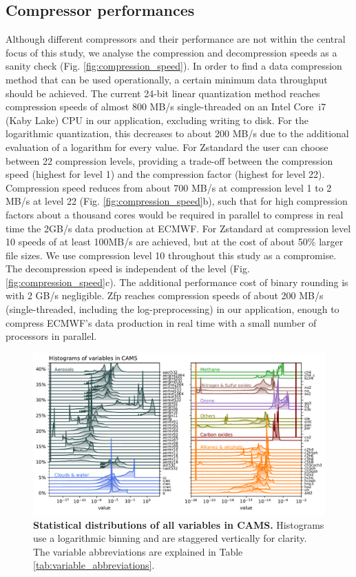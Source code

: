 \subsection{Compressor performances}

Although different compressors and their performance are not within the central focus of this study, we analyse
the compression and decompression speeds as a sanity check (Fig. \ref{fig:compression_speed}). In order to
find a data compression method that can be used operationally, a certain minimum data throughput should be achieved.
The current 24-bit linear quantization method reaches compression speeds of almost 800 MB/s single-threaded on an
Intel Core\texttrademark~i7 (Kaby Lake) CPU in our application, excluding writing to disk. For the logarithmic quantization,
this decreases to about 200 MB/s due to the additional evaluation of a logarithm for every value. For Zstandard the user
can choose between 22 compression levels, providing a trade-off between the compression speed (highest for level 1)
and the compression factor (highest for level 22). Compression speed reduces from about 700 MB/s at compression level 1
to 2 MB/s at level 22 (Fig. \ref{fig:compression_speed}b), such that for high compression factors about a thousand cores
would be required in parallel to compress in real time the 2GB/s data production at ECMWF. For Zstandard at compression
level 10 speeds of at least 100MB/s are achieved, but at the cost of about 50\% larger file sizes. We use compression level
10 throughout this study as a compromise. The decompression speed is independent of the level (Fig. \ref{fig:compression_speed}c).
The additional performance cost of binary rounding is with 2 GB/s negligible. Zfp reaches compression speeds of about 200 MB/s
(single-threaded, including the log-preprocessing) in our application, enough to compress ECMWF’s data production in real
time with a small number of processors in parallel.

\begin{figure}[tbhp]
	\includegraphics[width=1\textwidth]{Figures/compression/histograms.pdf}
	\caption{\textbf{Statistical distributions of all variables in CAMS.}
	Histograms use a logarithmic binning and are staggered vertically for clarity.
	The variable abbreviations are explained in Table \ref{tab:variable_abbreviations}.}
	\label{fig:cams_histograms}
\end{figure}

